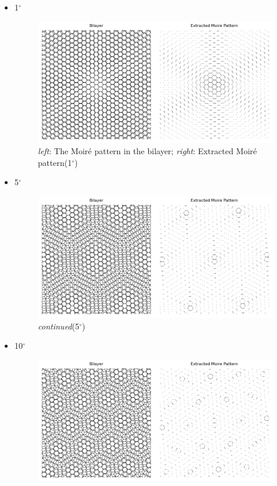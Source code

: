 \documentclass[12pt,a4paper]{article}
\begin{document}
\begin{CJK}{UTF8}{bkai}
\begin{itemize}
    \item 1$^\circ$
    \begin{figure}[h]
        \centering
        \vspace{-0.5cm}
        \includegraphics[width=0.65\linewidth]{figures/1degree_moire.png}
        \caption{\textit{left}: The Moiré pattern in the bilayer; \textit{right}: Extracted Moiré pattern(1$^\circ$)}
        \vspace{-0.5cm}
        \label{fig:moire_1_extract}
    \end{figure}
    \item 5$^\circ$
    \begin{figure}[h]
        \centering
        \vspace{-0.5cm}
        \includegraphics[width=0.65\linewidth]{figures/5degree_moire.png}
        \vspace{-0.5cm}
        \caption{\textit{continued}(5$^\circ$)}
        \label{fig:moire_5_extract}
    \end{figure}
    \item 10$^\circ$
    \begin{figure}[h]
        \centering
        \vspace{-0.5cm}
        \includegraphics[width=0.65\linewidth]{figures/10degree_moire.png}

\end{figure}
\end{itemize}
\end{CJK}
\end{document}
